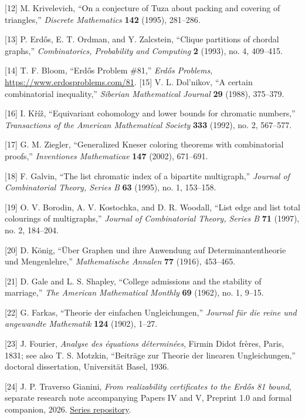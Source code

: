 \documentclass[english,11pt,a4paper]{article}
\begin{document}
{[}12{]} M. Krivelevich, ``On a conjecture of Tuza about packing and
covering of triangles,'' \emph{Discrete Mathematics} \textbf{142}
(1995), 281--286.

{[}13{]} P. Erdős, E. T. Ordman, and Y. Zalcstein, ``Clique partitions
of chordal graphs,'' \emph{Combinatorics, Probability and Computing}
\textbf{2} (1993), no. 4, 409--415.

{[}14{]} T. F. Bloom, ``Erdős Problem \#81,'' \emph{Erdős Problems},
\url{https://www.erdosproblems.com/81}. {[}15{]} V. L. Dol'nikov, ``A
certain combinatorial inequality,'' \emph{Siberian Mathematical Journal}
\textbf{29} (1988), 375--379.

{[}16{]} I. Kříž, ``Equivariant cohomology and lower bounds for
chromatic numbers,'' \emph{Transactions of the American Mathematical
Society} \textbf{333} (1992), no. 2, 567--577.

{[}17{]} G. M. Ziegler, ``Generalized Kneser coloring theorems with
combinatorial proofs,'' \emph{Inventiones Mathematicae} \textbf{147}
(2002), 671--691.

{[}18{]} F. Galvin, ``The list chromatic index of a bipartite
multigraph,'' \emph{Journal of Combinatorial Theory, Series B}
\textbf{63} (1995), no. 1, 153--158.

{[}19{]} O. V. Borodin, A. V. Kostochka, and D. R. Woodall, ``List edge
and list total colourings of multigraphs,'' \emph{Journal of
Combinatorial Theory, Series B} \textbf{71} (1997), no. 2, 184--204.

{[}20{]} D. König, ``Über Graphen und ihre Anwendung auf
Determinantentheorie und Mengenlehre,'' \emph{Mathematische Annalen}
\textbf{77} (1916), 453--465.

{[}21{]} D. Gale and L. S. Shapley, ``College admissions and the
stability of marriage,'' \emph{The American Mathematical Monthly}
\textbf{69} (1962), no. 1, 9--15.

{[}22{]} G. Farkas, ``Theorie der einfachen Ungleichungen,''
\emph{Journal für die reine und angewandte Mathematik} \textbf{124}
(1902), 1--27.

{[}23{]} J. Fourier, \emph{Analyse des équations déterminées}, Firmin
Didot frères, Paris, 1831; see also T. S. Motzkin, ``Beiträge zur
Theorie der linearen Ungleichungen,'' doctoral dissertation, Universität
Basel, 1936.

{[}24{]} J. P. Traverso Gianini, \emph{From realizability certificates
to the Erdős 81 bound}, separate research note accompanying Papers IV
and V, Preprint 1.0 and formal companion, 2026.
\href{https://github.com/jtraverso/erdos-81-chordal-clique-partitions}{Series
repository}.
\end{document}
